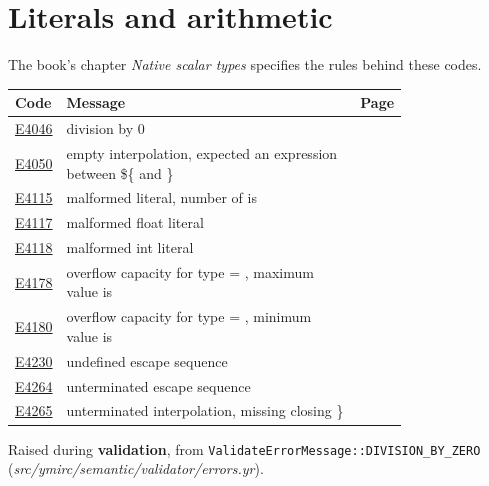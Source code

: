 
\clearpage
\section{Literals and arithmetic}
\label{sec:codes:literals}

The book's chapter \textit{Native scalar types} specifies the rules behind these codes.

\begin{longtable}{@{}l p{0.78\linewidth} r@{}}
\toprule Code & Message & Page\\ \midrule \endhead
\hyperref[sec:codes:e4046]{E4046} & division by 0 & \pageref{sec:codes:e4046}\\
\hyperref[sec:codes:e4050]{E4050} & empty interpolation, expected an expression between \$\{ and \} & \pageref{sec:codes:e4050}\\
\hyperref[sec:codes:e4115]{E4115} & malformed literal, number of \errhole{} is \errhole{} & \pageref{sec:codes:e4115}\\
\hyperref[sec:codes:e4117]{E4117} & malformed float literal \errhole{} & \pageref{sec:codes:e4117}\\
\hyperref[sec:codes:e4118]{E4118} & malformed int literal \errhole{} & \pageref{sec:codes:e4118}\\
\hyperref[sec:codes:e4178]{E4178} & overflow capacity for type \errhole{} = \errhole{}, maximum value is \errhole{} & \pageref{sec:codes:e4178}\\
\hyperref[sec:codes:e4180]{E4180} & overflow capacity for type \errhole{} = \errhole{}, minimum value is \errhole{} & \pageref{sec:codes:e4180}\\
\hyperref[sec:codes:e4230]{E4230} & undefined escape sequence & \pageref{sec:codes:e4230}\\
\hyperref[sec:codes:e4264]{E4264} & unterminated escape sequence & \pageref{sec:codes:e4264}\\
\hyperref[sec:codes:e4265]{E4265} & unterminated interpolation, missing closing \} & \pageref{sec:codes:e4265}\\
\bottomrule
\end{longtable}

\label{sec:codes:e4046}

Raised during \textbf{validation}, from \texttt{ValidateErrorMessage::\allowbreak{}DIVISION\_\allowbreak{}BY\_\allowbreak{}ZERO} (\textit{src/\allowbreak{}ymirc/\allowbreak{}semantic/\allowbreak{}validator/\allowbreak{}errors.yr}).

